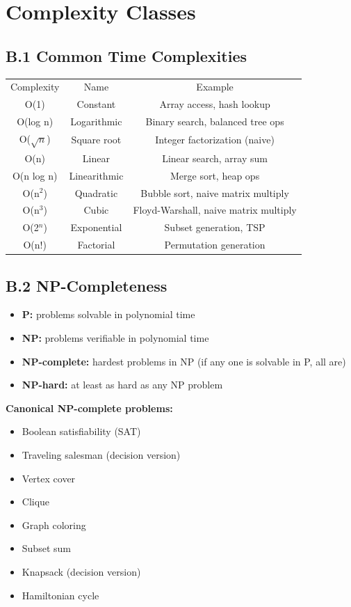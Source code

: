 \chapter{Complexity Classes}\label{appendices:complexity-classes}

\section{B.1 Common Time Complexities}

\begin{center}
\begin{tabular}{ccc}
\toprule
Complexity & Name & Example \\
O(1) & Constant & Array access, hash lookup \\
O(log n) & Logarithmic & Binary search, balanced tree ops \\
O($\sqrt {n}$) & Square root & Integer factorization (naive) \\
O(n) & Linear & Linear search, array sum \\
O(n log n) & Linearithmic & Merge sort, heap ops \\
O(n$^{2}$) & Quadratic & Bubble sort, naive matrix multiply \\
O(n$^{3}$) & Cubic & Floyd-Warshall, naive matrix multiply \\
O(2$^{n}$) & Exponential & Subset generation, TSP \\
O(n!) & Factorial & Permutation generation \\

\bottomrule
\end{tabular}
\end{center}
\section{B.2 NP-Completeness}

\begin{itemize}
\item \textbf{P:} problems solvable in polynomial time
\item \textbf{NP:} problems verifiable in polynomial time
\item \textbf{NP-complete:} hardest problems in NP (if any one is solvable in P, all are)
\item \textbf{NP-hard:} at least as hard as any NP problem
\end{itemize}

\textbf{Canonical NP-complete problems:}
\begin{itemize}
\item Boolean satisfiability (SAT)
\item Traveling salesman (decision version)
\item Vertex cover
\item Clique
\item Graph coloring
\item Subset sum
\item Knapsack (decision version)
\item Hamiltonian cycle
\end{itemize}

